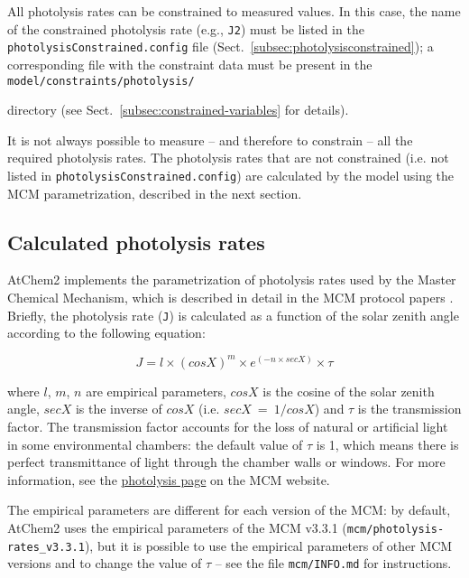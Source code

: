 All photolysis rates can be constrained to measured values. In this
case, the name of the constrained photolysis rate (e.g., \texttt{J2})
must be listed in the \texttt{photolysisConstrained.config} file
(Sect.~\ref{subsec:photolysisconstrained}); a corresponding file with the
constraint data must be present in the \texttt{model/constraints/photolysis/}

directory (see Sect.~\ref{subsec:constrained-variables} for details).

It is not always possible to measure -- and therefore to constrain --
all the required photolysis rates. The photolysis rates that are not
constrained (i.e. not listed in \texttt{photolysisConstrained.config})
are calculated by the model using the MCM parametrization, described
in the next section.

\subsection{Calculated photolysis rates} \label{subsec:calculated-photolysis-rates}

AtChem2 implements the parametrization of photolysis rates used by the
Master Chemical Mechanism, which is described in detail in the MCM
protocol papers \citep{jenkin_1997, saunders_2003}. Briefly, the
photolysis rate (\texttt{J}) is calculated as a function of the solar
zenith angle according to the following equation:

\begin{equation}
  J = l \times (cosX)^m \times e^{(-n \times secX)} \times \tau
\end{equation}

where $l$, $m$, $n$ are empirical parameters, $cosX$ is the cosine of
the solar zenith angle, $secX$ is the inverse of $cosX$ (i.e.
$secX\ =\ 1/cosX$) and $\tau$ is the transmission factor. The
transmission factor accounts for the loss of natural or artificial
light in some environmental chambers: the default value of $\tau$ is
1, which means there is perfect transmittance of light through the
chamber walls or windows. For more information, see the
\href{https://mcm.york.ac.uk/MCM/rates/photolysis}{photolysis page}
on the MCM website.

The empirical parameters are different for each version of the MCM: by
default, AtChem2 uses the empirical parameters of the MCM v3.3.1
(\texttt{mcm/photolysis-rates\_v3.3.1}), but it is possible to use the
empirical parameters of other MCM versions and to change the value of
$\tau$ -- see the file \texttt{mcm/INFO.md} for instructions.

